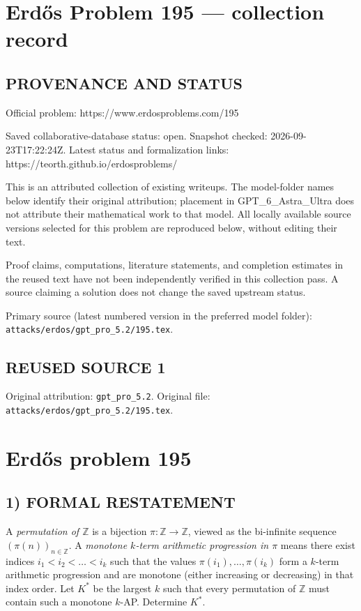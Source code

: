 \section*{Erd\H{o}s Problem 195 --- collection record}

\subsection*{PROVENANCE AND STATUS}
Official problem: https://www.erdosproblems.com/195

Saved collaborative-database status: open.
Snapshot checked: 2026-09-23T17:22:24Z.
Latest status and formalization links: https://teorth.github.io/erdosproblems/

This is an attributed collection of existing writeups. The model-folder names below identify their original attribution; placement in GPT\_6\_Astra\_Ultra does not attribute their mathematical work to that model. All locally available source versions selected for this problem are reproduced below, without editing their text.

Proof claims, computations, literature statements, and completion estimates in the reused text have not been independently verified in this collection pass. A source claiming a solution does not change the saved upstream status.

Primary source (latest numbered version in the preferred model folder): \texttt{attacks/erdos/gpt\_pro\_5.2/195.tex}.

\subsection*{REUSED SOURCE 1}
Original attribution: \texttt{gpt\_pro\_5.2}.
Original file: \texttt{attacks/erdos/gpt\_pro\_5.2/195.tex}.

\section*{Erd\H{o}s problem 195}

\subsection*{1) FORMAL RESTATEMENT}
A \emph{permutation of $\mathbb{Z}$} is a bijection $\pi:\mathbb{Z}\to\mathbb{Z}$, viewed as the bi-infinite sequence $(\pi(n))_{n\in\mathbb{Z}}$.
A \emph{monotone $k$-term arithmetic progression in $\pi$} means there exist indices $i_1<i_2<\dots<i_k$ such that the values
$\pi(i_1),\dots,\pi(i_k)$ form a $k$-term arithmetic progression and are monotone (either increasing or decreasing) in that index order.
Let $K^*$ be the largest $k$ such that every permutation of $\mathbb{Z}$ must contain such a monotone $k$-AP.
Determine $K^*$.

